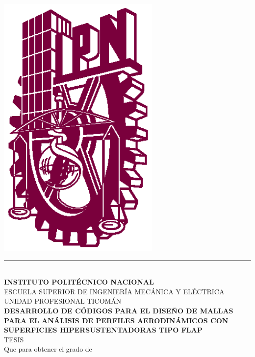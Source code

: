 \documentclass[letterpaper, openright, 12pt]{book}
\begin{document}
    \begin{titlepage}
        \begin{center}
                \includegraphics[keepaspectratio, width=80mm]{./img/ipn_logo}
        \vspace*{2mm}
        \rule{\textwidth}{1.5pt}\\
        \vspace*{2mm}
        \textbf{INSTITUTO POLITÉCNICO NACIONAL}\\
        \vspace*{3mm}
        ESCUELA SUPERIOR DE INGENIERÍA MECÁNICA Y ELÉCTRICA\\
        UNIDAD PROFESIONAL TICOMÁN\\
        \vspace{15mm}
        \textbf{DESARROLLO DE CÓDIGOS PARA EL DISEÑO DE MALLAS PARA EL
        ANÁLISIS DE PERFILES AERODINÁMICOS CON SUPERFICIES HIPERSUSTENTADORAS
    TIPO FLAP}\\
        \vspace*{12mm}
        TESIS\\
        \vspace{2mm}
        Que para obtener el grado de\\

\end{center}
\end{titlepage}
\end{document}
